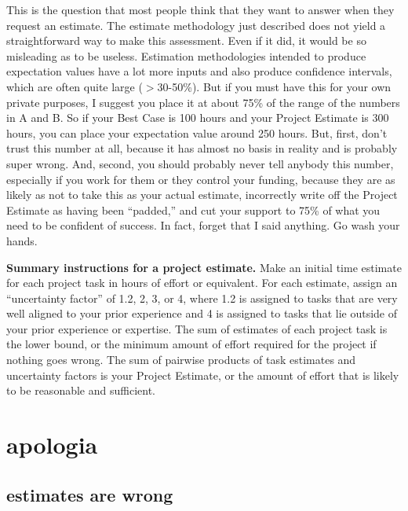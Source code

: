\documentclass[12pt,oneside]{book}
\begin{document}
This is the question that most people think that they want to answer when they request an estimate. The estimate methodology just described does not yield a straightforward way to make this assessment. Even if it did, it would be so misleading as to be useless. Estimation methodologies intended to produce expectation values have a lot more inputs and also produce confidence intervals, which are often quite large ($>$30-50\%). But if you must have this for your own private purposes, I suggest you place it at about 75\% of the range of the numbers in A and B. So if your Best Case is 100 hours and your Project Estimate is 300 hours, you can place your expectation value around 250 hours. But, first, don't trust this number at all, because it has almost no basis in reality and is probably super wrong. And, second, you should probably never tell anybody this number, especially if you work for them or they control your funding, because they are as likely as not to take this as your actual estimate, incorrectly write off the Project Estimate as having been ``padded,'' and cut your support to 75\% of what you need to be confident of success. In fact, forget that I said anything. Go wash your hands.

\hfill
\begin{mdframed}[everyline=true]
\textbf{Summary instructions for a project estimate.} Make an initial time estimate for each project task in hours of effort or equivalent. For each estimate, assign an ``uncertainty factor'' of 1.2, 2, 3, or 4, where 1.2 is assigned to tasks that are very well aligned to your prior experience and 4 is assigned to tasks that lie outside of your prior experience or expertise. The sum of estimates of each project task is the lower bound, or the minimum amount of effort required for the project if nothing goes wrong. The sum of pairwise products of task estimates and uncertainty factors is your Project Estimate, or the amount of effort that is likely to be reasonable and sufficient.
\end{mdframed}

\newpage
{}
\chapter*{apologia}

\section*{estimates are wrong}
\end{document}

